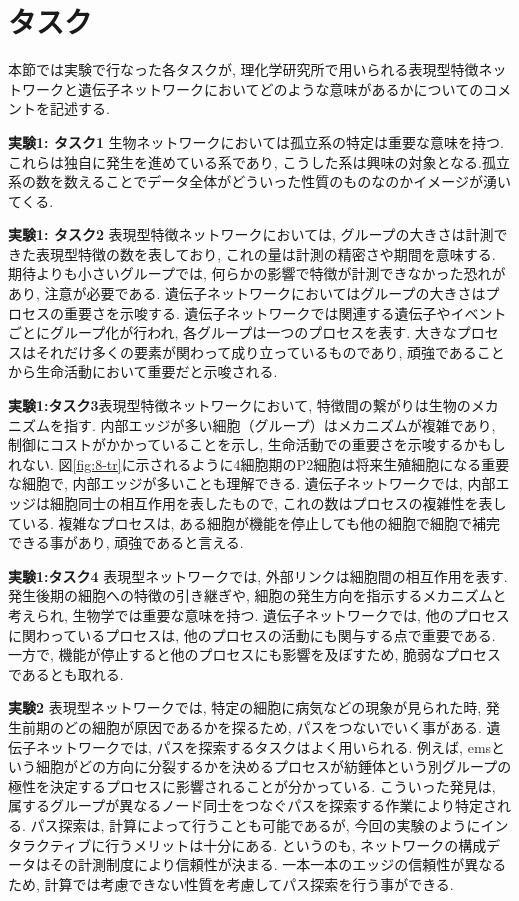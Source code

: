 \documentclass{kuee}
\begin{document}
\section{タスク}
本節では実験で行なった各タスクが, 理化学研究所で用いられる表現型特徴ネットワークと遺伝子ネットワークにおいてどのような意味があるかについてのコメントを記述する.
\begin{description}
  \item{\bf 実験1: タスク1} 生物ネットワークにおいては孤立系の特定は重要な意味を持つ.これらは独自に発生を進めている系であり, こうした系は興味の対象となる.孤立系の数を数えることでデータ全体がどういった性質のものなのかイメージが湧いてくる.
  \item{\bf 実験1: タスク2} 表現型特徴ネットワークにおいては, グループの大きさは計測できた表現型特徴の数を表しており, これの量は計測の精密さや期間を意味する.
  期待よりも小さいグループでは, 何らかの影響で特徴が計測できなかった恐れがあり, 注意が必要である.
  遺伝子ネットワークにおいてはグループの大きさはプロセスの重要さを示唆する.
  遺伝子ネットワークでは関連する遺伝子やイベントごとにグループ化が行われ, 各グループは一つのプロセスを表す.
  大きなプロセスはそれだけ多くの要素が関わって成り立っているものであり, 頑強であることから生命活動において重要だと示唆される.
  \item{\bf 実験1:タスク3}表現型特徴ネットワークにおいて, 特徴間の繋がりは生物のメカニズムを指す.
  内部エッジが多い細胞（グループ）はメカニズムが複雑であり, 制御にコストがかかっていることを示し, 生命活動での重要さを示唆するかもしれない.
  図\ref{fig:8-tr}に示されるように4細胞期のP2細胞は将来生殖細胞になる重要な細胞で, 内部エッジが多いことも理解できる.
  遺伝子ネットワークでは, 内部エッジは細胞同士の相互作用を表したもので, これの数はプロセスの複雑性を表している.
  複雑なプロセスは, ある細胞が機能を停止しても他の細胞で細胞で補完できる事があり, 頑強であると言える.
  \item{\bf 実験1:タスク4} 表現型ネットワークでは, 外部リンクは細胞間の相互作用を表す.
  発生後期の細胞への特徴の引き継ぎや, 細胞の発生方向を指示するメカニズムと考えられ, 生物学では重要な意味を持つ.
  遺伝子ネットワークでは, 他のプロセスに関わっているプロセスは, 他のプロセスの活動にも関与する点で重要である.
  一方で, 機能が停止すると他のプロセスにも影響を及ぼすため, 脆弱なプロセスであるとも取れる.
  \item{\bf 実験2} 表現型ネットワークでは, 特定の細胞に病気などの現象が見られた時, 発生前期のどの細胞が原因であるかを探るため, パスをつないでいく事がある.
  遺伝子ネットワークでは, パスを探索するタスクはよく用いられる.
  例えば, emsという細胞がどの方向に分裂するかを決めるプロセスが紡錘体という別グループの極性を決定するプロセスに影響されることが分かっている.
  こういった発見は, 属するグループが異なるノード同士をつなぐパスを探索する作業により特定される.
  パス探索は, 計算によって行うことも可能であるが, 今回の実験のようにインタラクティブに行うメリットは十分にある.
  というのも, ネットワークの構成データはその計測制度により信頼性が決まる.
  一本一本のエッジの信頼性が異なるため, 計算では考慮できない性質を考慮してパス探索を行う事ができる.
\end{description}
\end{document}
